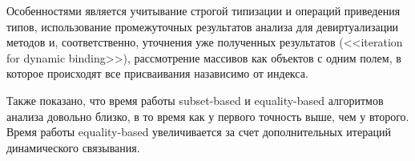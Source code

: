 \documentclass[12pt]{article}
\newcommand{\eng}[1]{{\English#1}}
\begin{document}
      Особенностями является учитывание строгой типизации и операций
      приведения типов, использование промежуточных результатов анализа для
      девиртуализации методов и, соответственно, уточнения уже полученных
      результатов (<<\eng{iteration for dynamic binding}>>),
      рассмотрение массивов как объектов с одним полем, в которое происходят
      все присваивания назависимо от индекса.

      Также показано, что время работы \eng{subset-based} и
      \eng{equality-based} алгоритмов анализа довольно близко, в то время как у
      первого точность выше, чем у второго.
      Время работы \eng{equality-based} увеличивается за счет дополнительных
      итераций динамического связывания.
\end{document}
